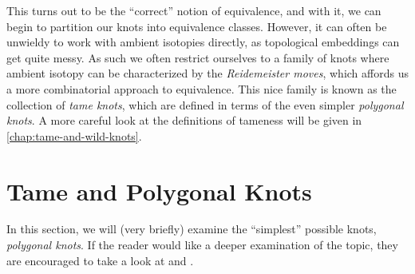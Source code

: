This turns out to be the ``correct'' notion of equivalence, and with
it, we can begin to partition our knots into equivalence classes.
However, it can often be unwieldy to work with ambient isotopies
directly, as topological embeddings can get quite messy. As such we
often restrict ourselves to a family of knots where ambient isotopy
can be characterized by the \emph{Reidemeister moves}, which affords
us a more combinatorial approach to equivalence. This nice family is
known as the collection of \emph{tame knots}, which are defined in
terms of the even simpler \emph{polygonal knots}. A more careful look
at the definitions of tameness will be given in
\cref{chap:tame-and-wild-knots}.

\section{Tame and Polygonal Knots}\label{sec:polygonal-knots}
In this section, we will (very briefly) examine the ``simplest''
possible knots, \emph{polygonal knots}. If the reader would like a
deeper examination of the topic, they are encouraged to take a look at
\cite{burde2003knots} and \cite{Crowell1963}.

